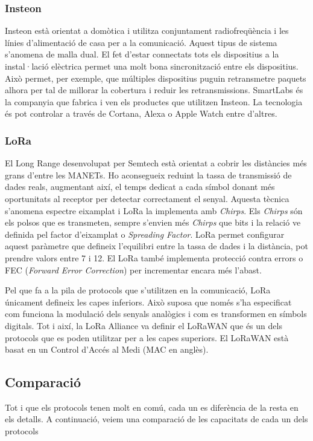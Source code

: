 \subsubsection{Insteon}
Insteon està orientat a domòtica i utilitza conjuntament radiofreqüència i les línies d'alimentació de casa per a la comunicació.
Aquest tipus de sistema s'anomena de malla dual.
El fet d'estar connectats tots els dispositius a la instal·lació elèctrica permet una molt bona sincronització entre els dispositius.
Això permet, per exemple, que múltiples dispositius puguin retransmetre paquets alhora per tal de millorar la cobertura i reduir les retransmissions.
SmartLabs és la companyia que fabrica i ven els productes que utilitzen Insteon.
La tecnologia és pot controlar a través de Cortana, Alexa o Apple Watch entre d'altres.

\subsubsection{LoRa}
El Long Range desenvolupat per Semtech està orientat a cobrir les distàncies més grans d'entre les MANETs.
Ho aconsegueix reduint la tassa de transmissió de dades reals, augmentant així, el temps dedicat a cada símbol donant més oportunitats al receptor per detectar correctament el senyal.
Aquesta tècnica s'anomena espectre eixamplat i LoRa la implementa amb \textit{Chirps}.
Els \textit{Chirps} són els polsos que es transmeten, sempre s'envien més \textit{Chirps} que bits i la relació ve definida pel factor d'eixamplat o \textit{Spreading Factor}.
LoRa permet configurar aquest paràmetre que defineix l'equilibri entre la tassa de dades i la distància, pot prendre valors entre 7 i 12.
El LoRa també implementa protecció contra errors o FEC (\textit{Forward Error Correction}) per incrementar encara més l'abast.

Pel que fa a la pila de protocols que s'utilitzen en la comunicació, LoRa únicament defineix les capes inferiors.
Això suposa que només s'ha especificat com funciona la modulació dels senyals analògics i com es transformen en símbols digitals.
Tot i així, la LoRa Alliance va definir el LoRaWAN que és un dels protocols que es poden utilitzar per a les capes superiors.
El LoRaWAN està basat en un Control d'Accés al Medi (MAC en anglès).


\subsection{Comparació}
Tot i que els protocols tenen molt en comú, cada un es diferència de la resta en els detalls.
A continuació, veiem una comparació de les capacitats de cada un dels protocols

